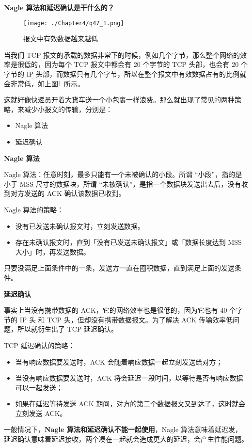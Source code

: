 \documentclass[cn,11pt,color=blue,lang=cn]{elegantbook}
\begin{document}
\begin{solution}
\begin{note} \textbf{Nagle 算法和延迟确认是干什么的？} \end{note}
\begin{figure}[htbp]
\centering
\texttt{[image: ./Chapter4/q47\_1.png]}
\caption{报文中有效数据越来越低}
\label{fig47_1}
\end{figure}

当我们 TCP 报文的承载的数据非常下的时候，例如几个字节，那么整个网络的效率是很低的，因为每个 TCP 报文中都会有 20 个字节的 TCP 头部，也会有 20 个字节的 IP 头部，而数据只有几个字节，所以在整个报文中有效数据占有的比例就会非常低，如上图\ref{fig47_1} 所示。

这就好像快递员开着大货车送一个小包裹一样浪费。那么就出现了常见的两种策略，来减少小报文的传输，分别是：
\begin{itemize}
	\item Nagle 算法
	\item 延迟确认
\end{itemize}

\begin{note} \textbf{Nagle 算法} \end{note}
Nagle 算法：任意时刻，最多只能有一个未被确认的小段。所谓 “小段”，指的是小于 MSS 尺寸的数据块，所谓 “未被确认”，是指一个数据块发送出去后，没有收到对方发送的 ACK 确认该数据已收到。

Nagle 算法的策略：
\begin{itemize}
	\item 没有已发送未确认报文时，立刻发送数据。
	\item 存在未确认报文时，直到「没有已发送未确认报文」或「数据长度达到 MSS 大小」时，再发送数据。
\end{itemize}

只要没满足上面条件中的一条，发送方一直在囤积数据，直到满足上面的发送条件。

\begin{note} \textbf{延迟确认} \end{note}
事实上当没有携带数据的 ACK，它的网络效率也是很低的，因为它也有 40 个字节的 IP 头 和 TCP 头，但却没有携带数据报文。为了解决 ACK 传输效率低问题，所以就衍生出了 TCP 延迟确认。

TCP 延迟确认的策略：
\begin{itemize}
	\item 当有响应数据要发送时，ACK 会随着响应数据一起立刻发送给对方；
	\item 当没有响应数据要发送时，ACK 将会延迟一段时间，以等待是否有响应数据可以一起发送；
	\item 如果在延迟等待发送 ACK 期间，对方的第二个数据报文又到达了，这时就会立刻发送 ACK。
\end{itemize}
一般情况下，\textbf{Nagle 算法和延迟确认不能一起使用}，Nagle 算法意味着延迟发，延迟确认意味着延迟接收，两个凑在一起就会造成更大的延迟，会产生性能问题。

\end{solution}
\end{document}
